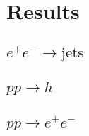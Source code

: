 \section{Results}
\label{sec:psunc:results}

\subsection{$e^+e^-\to\text{jets}$}
\label{sec:psunc:results:ee}

\subsection{$pp\to h$}
\label{sec:psunc:results:h}

\subsection{$pp\to e^+e^-$}
\label{sec:psunc:results:dy}
